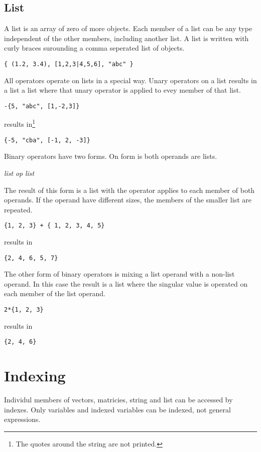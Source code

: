 \documentclass{article}
\begin{document}
\subsection{List}
A list is an array of zero of more objects.
Each member of a list can be any type independent of the other members, including another list.
A list is written with curly braces surounding a comma seperated list of objects.
\begin{verbatim}
{ (1.2, 3.4), [1,2,3|4,5,6], "abc" }
\end{verbatim}

All operators operate on lists in a special way.
Unary operators on a list results in a list a list where that unary operator is
applied to evey member of that list.
\begin{verbatim}
-{5, "abc", [1,-2,3]}
\end{verbatim}
results in\footnote{The quotes around the string are not printed.}
\begin{verbatim}
{-5, "cba", [-1, 2, -3]}
\end{verbatim}

Binary operators have two forms.
On form is both operands are lists.
\begin{center}
  \emph{list} \emph{op} \emph{list}
\end{center}
The result of this form is a list with the operator applies
to each member of both operands. If the operand have different
sizes, the members of the smaller list are repeated.
\begin{verbatim}
{1, 2, 3} + { 1, 2, 3, 4, 5}
\end{verbatim}
results in
\begin{verbatim}
{2, 4, 6, 5, 7}
\end{verbatim}

The other form of binary operators is mixing a list operand with a non-list operand.
In this case the result is a list where the singular value is operated on each member
of the list operand.
\begin{verbatim}
2*{1, 2, 3}
\end{verbatim}
results in
\begin{verbatim}
{2, 4, 6}
\end{verbatim}

\section{Indexing}
Individul members of vectors, matricies, string and list can be accessed
by indexes. Only variables and indexed variables can be indexed, not
general expressions.
\end{document}
